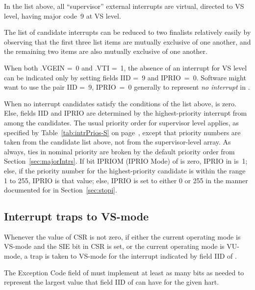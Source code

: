 In the list above, all ``supervisor'' external interrupts are virtual,
directed to VS level, having major code~9 at VS level.

\begin{commentary}
The list of candidate interrupts can be reduced to two finalists
relatively easily by observing that the first three list items are
mutually exclusive of one another, and the remaining two items are also
mutually exclusive of one another.
\end{commentary}

\begin{commentary}
When both .VGEIN =~0 and .VTI =~1, the
absence of an interrupt for VS level can be indicated only by setting
 fields IID =~9 and IPRIO~=~0.
Software might want to use the pair IID =~9, IPRIO~=~0 generally to
represent\/ \emph{no interrupt} in .
\end{commentary}

When no interrupt candidates satisfy the conditions of the list above,
 is zero.
Else,  fields IID and IPRIO are determined by the
highest-priority interrupt from among the candidates.
The usual priority order for supervisor level applies, as specified by
Table~\ref{tab:intrPrios-S} on page~\pageref{tab:intrPrios-S}, except
that priority numbers are taken from the candidate list above, not from
the supervisor-level  array.
As always, ties in nominal priority are broken by the default priority
order from Section~\ref{sec:majorIntrs}.
If bit IPRIOM (IPRIO Mode) of  is zero,
IPRIO in  is~1;
else, if the priority number for the highest-priority candidate is within the
range 1 to 255, IPRIO is that value;
else, IPRIO is set to either 0 or 255 in the manner documented
for  in Section~\ref{sec:stopi}.

\subsection{Interrupt traps to \mbox{VS-mode}}

Whenever the value of CSR  is not zero, if either the current
operating mode is \mbox{VS-mode} and the SIE bit in CSR 
is set, or the current operating mode is \mbox{VU-mode}, a trap is
taken to \mbox{VS-mode} for the interrupt indicated by field IID of
.

The Exception Code field of  must implement at least as
many bits as needed to represent the largest value that field IID of
 can have for the given hart.

